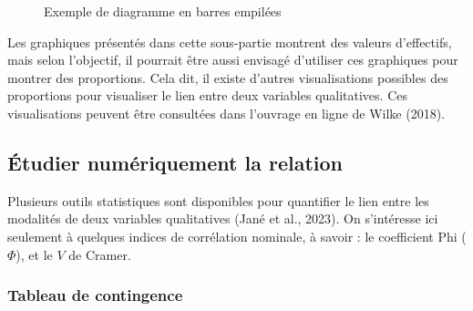 \documentclass[
  letterpaper,
]{book}
\begin{document}
\begin{figure}[H]


\caption{\label{fig-stackedBarsBiv}Exemple de diagramme en barres
empilées}

\end{figure}%

Les graphiques présentés dans cette sous-partie montrent des valeurs
d'effectifs, mais selon l'objectif, il pourrait être aussi envisagé
d'utiliser ces graphiques pour montrer des proportions. Cela dit, il
existe d'autres visualisations possibles des proportions pour visualiser
le lien entre deux variables qualitatives. Ces visualisations peuvent
être consultées dans l'ouvrage en ligne de Wilke (2018).

\subsection{Étudier numériquement la
relation}\label{uxe9tudier-numuxe9riquement-la-relation-1}

Plusieurs outils statistiques sont disponibles pour quantifier le lien
entre les modalités de deux variables qualitatives (Jané et al., 2023).
On s'intéresse ici seulement à quelques indices de corrélation nominale,
à savoir : le coefficient Phi (\(\Phi\)), et le \(V\) de Cramer.

\subsubsection{Tableau de contingence}\label{tableau-de-contingence}
\end{document}
